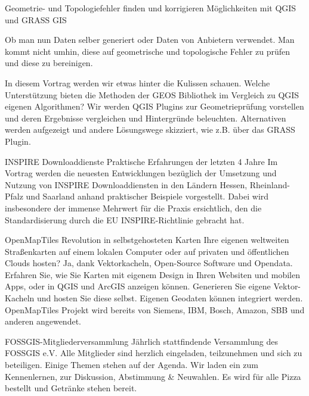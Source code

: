 %
{Geometrie- und Topologiefehler finden und korrigieren}%
{Möglichkeiten mit QGIS und GRASS GIS}%
{%
Ob man nun Daten selber generiert oder Daten von Anbietern verwendet. Man kommt nicht umhin, diese auf geometrische und topologische Fehler zu prüfen und diese zu bereinigen. 

In diesem Vortrag werden wir etwas hinter die Kulissen schauen. Welche Unterstützung bieten die Methoden der GEOS Bibliothek im Vergleich zu QGIS eigenen Algorithmen? Wir werden QGIS Plugins zur Geometrieprüfung vorstellen und deren Ergebnisse vergleichen und Hintergründe beleuchten. Alternativen werden aufgezeigt und andere Lösungswege skizziert, wie z.B. über das GRASS Plugin.%
}

%
{INSPIRE Downloaddienste}%
{Praktische Erfahrungen der letzten 4 Jahre}%
{%
Im Vortrag werden die neuesten Entwicklungen bezüglich der Umsetzung und Nutzung von INSPIRE Downloaddiensten in den Ländern Hessen, Rheinland-Pfalz und Saarland anhand praktischer Beispiele vorgestellt. Dabei wird insbesondere der immense Mehrwert für die Praxis ersichtlich, den die Standardisierung durch die EU INSPIRE-Richtlinie gebracht hat.%
}

%
{OpenMapTiles}%
{Revolution in selbstgehosteten Karten}%
{%
Ihre eigenen weltweiten Straßenkarten auf einem lokalen Computer oder auf privaten und öffentlichen Clouds hosten? Ja, dank Vektorkacheln, Open-Source Software und Opendata. Erfahren Sie, wie Sie Karten mit eigenem Design in Ihren Websiten und mobilen Apps, oder in QGIS und ArcGIS anzeigen können. Generieren Sie eigene Vektor-Kacheln und hosten Sie diese selbst. Eigenen Geodaten können integriert werden. OpenMapTiles Projekt wird bereits von Siemens, IBM, Bosch, Amazon, SBB und anderen angewendet.%
}

\abstractZwei{}%
{FOSSGIS-Mitgliederversammlung}%
{Jährlich stattfindende Versammlung des FOSSGIS e.V.}%
{%
Alle Mitglieder sind herzlich eingeladen, teilzunehmen und sich zu beteiligen. Einige Themen stehen auf der Agenda. Wir laden ein zum Kennenlernen, zur Diskussion, Abstimmung & Neuwahlen. Es wird für alle Pizza bestellt und Getränke stehen bereit.%
}
